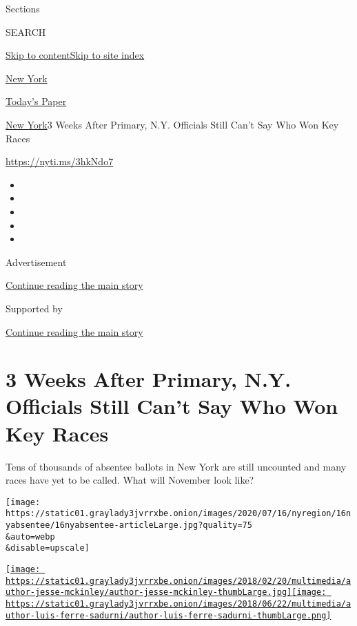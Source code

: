 Sections

SEARCH

\protect\hyperlink{site-content}{Skip to
content}\protect\hyperlink{site-index}{Skip to site index}

\href{https://www.nytimes3xbfgragh.onion/section/nyregion}{New York}

\href{https://myaccount.nytimes3xbfgragh.onion/auth/login?response_type=cookie\&client_id=vi}{}

\href{https://www.nytimes3xbfgragh.onion/section/todayspaper}{Today's
Paper}

\href{/section/nyregion}{New York}\textbar{}3 Weeks After Primary, N.Y.
Officials Still Can't Say Who Won Key Races

\url{https://nyti.ms/3hkNdo7}

\begin{itemize}
\item
\item
\item
\item
\item
\end{itemize}

Advertisement

\protect\hyperlink{after-top}{Continue reading the main story}

Supported by

\protect\hyperlink{after-sponsor}{Continue reading the main story}

\hypertarget{3-weeks-after-primary-ny-officials-still-cant-say-who-won-key-races}{%
\section{3 Weeks After Primary, N.Y. Officials Still Can't Say Who Won
Key
Races}\label{3-weeks-after-primary-ny-officials-still-cant-say-who-won-key-races}}

Tens of thousands of absentee ballots in New York are still uncounted
and many races have yet to be called. What will November look like?

\texttt{[image: https://static01.graylady3jvrrxbe.onion/images/2020/07/16/nyregion/16nyabsentee/16nyabsentee-articleLarge.jpg?quality=75\\\&auto=webp\\\&disable=upscale]}

\href{https://www.nytimes3xbfgragh.onion/by/jesse-mckinley}{\texttt{[image: https://static01.graylady3jvrrxbe.onion/images/2018/02/20/multimedia/author-jesse-mckinley/author-jesse-mckinley-thumbLarge.jpg]}}\href{https://www.nytimes3xbfgragh.onion/by/luis-ferre-sadurni}{\texttt{[image: https://static01.graylady3jvrrxbe.onion/images/2018/06/22/multimedia/author-luis-ferre-sadurni/author-luis-ferre-sadurni-thumbLarge.png]}}

